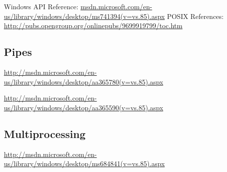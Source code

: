 \documentclass[letterpaper,10pt]{article}
\begin{document}
Windows API Reference: \url{msdn.microsoft.com/en-us/library/windows/desktop/ms741394(v=vs.85).aspx}
POSIX References: \url{http://pubs.opengroup.org/onlinepubs/9699919799/toc.htm}

\subsection{Pipes}
\url{http://msdn.microsoft.com/en-us/library/windows/desktop/aa365780(v=vs.85).aspx}

\url{http://msdn.microsoft.com/en-us/library/windows/desktop/aa365590(v=vs.85).aspx}

\subsection{Multiprocessing}
\url{http://msdn.microsoft.com/en-us/library/windows/desktop/ms684841(v=vs.85).aspx}
\end{document}
